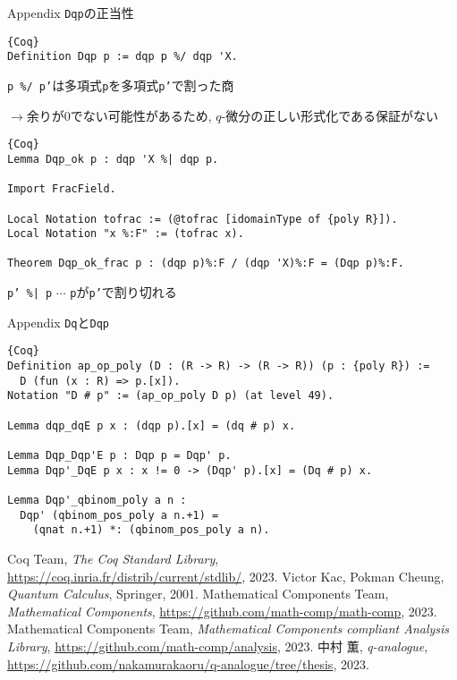 \documentclass[dvipdfmx,cjk]{beamer}
\theoremstyle{mystyle}
\newcommand{\0}{\textbf{0}}
\begin{document}
\begin{frame}[fragile]{Appendix {\tt Dqp}の正当性}
	\begin{lstlisting}{Coq}
Definition Dqp p := dqp p %/ dqp 'X.
\end{lstlisting}
	{\tt p \%/ p'}は多項式{\tt p}を多項式{\tt p'}で割った商
	
	$\to$余りが$0$でない可能性があるため, $q$-微分の正しい形式化である保証がない
	\begin{lstlisting}{Coq}
Lemma Dqp_ok p : dqp 'X %| dqp p.

Import FracField.

Local Notation tofrac := (@tofrac [idomainType of {poly R}]).
Local Notation "x %:F" := (tofrac x).

Theorem Dqp_ok_frac p : (dqp p)%:F / (dqp 'X)%:F = (Dqp p)%:F.
\end{lstlisting}
	{\tt p' \%| p} $\cdots$ {\tt p}が{\tt p'}で割り切れる
\end{frame}

\begin{frame}[fragile]{Appendix {\tt Dq}と{\tt Dqp}}
	\begin{lstlisting}{Coq}
Definition ap_op_poly (D : (R -> R) -> (R -> R)) (p : {poly R}) :=
  D (fun (x : R) => p.[x]).
Notation "D # p" := (ap_op_poly D p) (at level 49).

Lemma dqp_dqE p x : (dqp p).[x] = (dq # p) x. 

Lemma Dqp_Dqp'E p : Dqp p = Dqp' p.
Lemma Dqp'_DqE p x : x != 0 -> (Dqp' p).[x] = (Dq # p) x.

Lemma Dqp'_qbinom_poly a n :
  Dqp' (qbinom_pos_poly a n.+1) =
    (qnat n.+1) *: (qbinom_pos_poly a n).\end{lstlisting}
\end{frame}
\begin{thebibliography}{9}
	 Coq Team, {\it The Coq Standard Library}, 
		\url{https://coq.inria.fr/distrib/current/stdlib/}, 2023.
	 Victor Kac, Pokman Cheung, {\it{Quantum Calculus}}, Springer, 2001.
	 Mathematical Components Team, {\it Mathematical Components}, 		
		\url{https://github.com/math-comp/math-comp}, 2023.
	 Mathematical Components Team, 
		{\it Mathematical Components compliant Analysis Library}, 
			\url{https://github.com/math-comp/analysis}, 2023.
	 中村 薫, {\it q-analogue}, 
		\url{https://github.com/nakamurakaoru/q-analogue/tree/thesis}, 2023.
\end{thebibliography}
\end{document}
